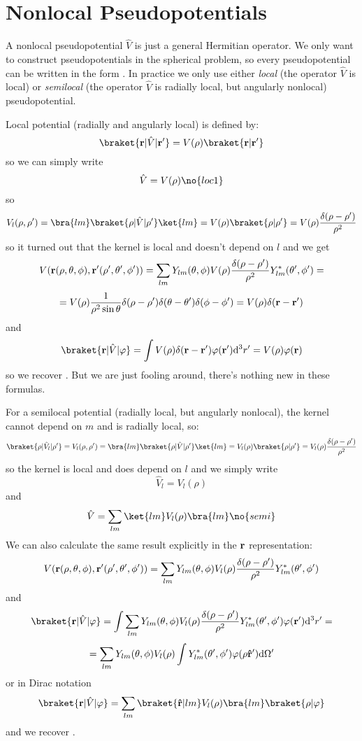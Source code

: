 \section{Nonlocal Pseudopotentials}

A nonlocal pseudopotential $\hat V$ is just a general Hermitian operator.
We only want to construct pseudopotentials in the spherical problem, so every
pseudopotential can be written in the form .
In practice we only use either {\it local\/} (the operator $\hat V$ is local)
or {\it semilocal\/} (the operator $\hat V$ is radially local, but angularly
nonlocal) pseudopotential.

Local potential (radially and angularly local) is defined by:
$$\braket{{\bf r}|\hat V|{\bf r'}}=V(\rho)\braket{{\bf r}|{\bf r'}}$$
so we can simply write
$$\hat V=V(\rho)\no{loc1}$$
so
$$V_l(\rho,\rho')
=\bra{lm}\braket{\rho|\hat V|\rho'}\ket{lm}
=V(\rho)\braket{\rho|\rho'}
=V(\rho){\delta(\rho-\rho')\over\rho^2}$$
so it turned out that the kernel is local and doesn't depend on $l$ and we get
$$V({\bf r}(\rho,\theta,\phi), {\bf r'}(\rho',\theta',\phi'))=
\sum_{lm}Y_{lm}(\theta,\phi) V(\rho){\delta(\rho-\rho')\over\rho^2} Y_{lm}^*(\theta',\phi')=
$$
$$
=V(\rho){1\over\rho^2\sin\theta}
\delta(\rho-\rho')\delta(\theta-\theta')\delta(\phi-\phi')=
V(\rho)\delta({\bf r}-{\bf r}')$$
and
$$\braket{{\bf r}|\hat V|\varphi}=\int 
V(\rho)\delta({\bf r}-{\bf r}')
\varphi({\bf r'})\d^3r'=V(\rho)\varphi({\bf r})$$
so we recover . But we are just fooling around, there's nothing new in these formulas.

For a semilocal potential (radially local, but angularly nonlocal), the kernel
cannot depend on $m$ and is radially local, so:
$$\braket{\rho|\hat V_l|\rho'}=V_l(\rho,\rho')
=\bra{lm}\braket{\rho|\hat V|\rho'}\ket{lm}
=V_l(\rho)\braket{\rho|\rho'}
=V_l(\rho){\delta(\rho-\rho')\over\rho^2}$$
so the kernel is local and does depend on $l$ and we simply write
$$\hat V_l=V_l(\rho)$$
and
$$\hat V=\sum_{lm} \ket{lm}V_l(\rho)\bra{lm}\no{semi}$$
We can also calculate the same result explicitly in the $\bf r$
representation:
$$V({\bf r}(\rho,\theta,\phi), {\bf r'}(\rho',\theta',\phi'))=
\sum_{lm}Y_{lm}(\theta,\phi) V_l(\rho){\delta(\rho-\rho')\over\rho^2} Y_{lm}^*(\theta',\phi')
$$
and
$$\braket{{\bf r}|\hat V|\varphi}=\int 
\sum_{lm}Y_{lm}(\theta,\phi) V_l(\rho){\delta(\rho-\rho')\over\rho^2} Y_{lm}^*(\theta',\phi')
\varphi({\bf r'})\d^3r'=$$
$$=
\sum_{lm}Y_{lm}(\theta,\phi) V_l(\rho) \int Y_{lm}^*(\theta',\phi')
\varphi(\rho{\bf\hat r'}){\rm d}\Omega'
$$
or in Dirac notation
$$\braket{{\bf r}|\hat V|\varphi}=
\sum_{lm} \braket{{\bf\hat r}|lm}V_l(\rho) \bra{lm}\braket{\rho|\varphi}
$$
and we recover .

